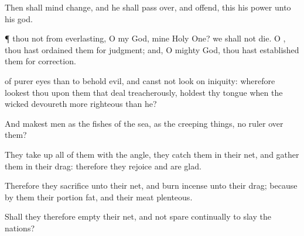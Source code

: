 {Then shall
{}
mind
change, and he shall pass
over, and
offend,
{}
this his
power unto his
god.


\par }{\PP {}¶
{} thou not from
everlasting, O
{} my
God, mine Holy
One? we shall not
die. O
{}, thou hast
ordained them for
judgment; and, O mighty
God, thou hast
established them for
correction.

 of
purer
eyes than to
behold
evil, and
canst not
look on
iniquity: wherefore
lookest thou upon them that deal
treacherously,
{} holdest thy
tongue when the
wicked
devoureth
{} more
righteous than he?

And
makest
men as the
fishes of the
sea, as the creeping
things,
{} no
ruler over them?

They take
up all of them with the
angle, they
catch them in their
net, and
gather them in their
drag: therefore they
rejoice and are
glad.

Therefore they
sacrifice unto their
net, and burn
incense unto their
drag; because by
them their
portion
{}
fat, and their
meat
plenteous.

Shall they therefore
empty their
net, and not
spare
continually to
slay the
nations?




\par }

